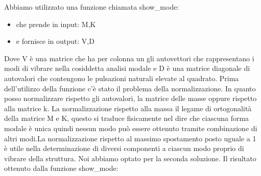 \documentclass{article}
\begin{document}
Abbiamo utilizzato una funzione chiamata show\_mode:
\begin{itemize}
    \item  che prende in input: M,K
    \item e fornisce in output: V,D
\end{itemize}
Dove V è una matrice che ha per colonna un gli autovettori che rappresentano i modi di vibrare nella cosiddetta analisi modale  e  D è una matrice diagonale di autovalori che contengono le pulsazioni naturali elevate al quadrato.
Prima dell'utilizzo della funzione c'è stato il problema della normalizzazione. In quanto posso normalizzare rispetto gli autovalori, la matrice delle masse oppure rispetto alla matrice k. La normalizzazione rispetto alla massa il legame di ortogonalità della matrice M e K, questo si traduce fisicamente nel dire che ciascuna forma modale è unica quindi nessun modo può essere ottenuto tramite combinazione di altri modi.La normalizzazione rispetto al massimo spostamento posto uguale a 1 è utile nella determinazione di diversi componenti a ciascun modo proprio di vibrare della struttura. Noi abbiamo optato per la seconda soluzione.
Il risultato ottenuto dalla funzione show\_mode:
\end{document}
